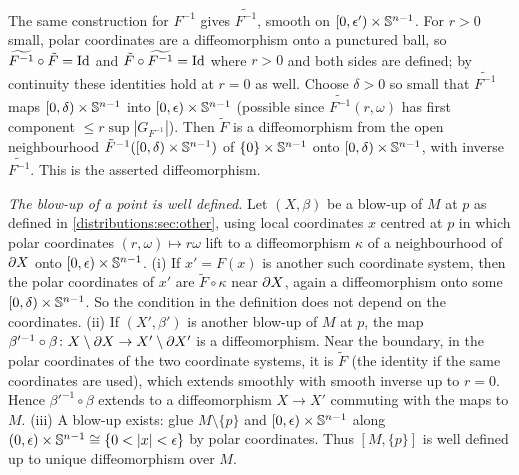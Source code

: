 The same construction for $F^{-1}$ gives $\widetilde{F^{-1}}$, smooth on
$[0,\epsilon')\times\mathbb{S}^{n-1}$. For $r>0$ small, polar coordinates are a
diffeomorphism onto a punctured ball, so $\widetilde{F^{-1}}\circ\tilde F=\operatorname{Id}$ and
$\tilde F\circ\widetilde{F^{-1}}=\operatorname{Id}$ where $r>0$ and both sides are defined; by
continuity these identities hold at $r=0$ as well. Choose $\delta>0$ so small that
$\widetilde{F^{-1}}$ maps $[0,\delta)\times\mathbb{S}^{n-1}$ into $[0,\epsilon)\times\mathbb{S}^{n-1}$
(possible since $\widetilde{F^{-1}}(r,\omega)$ has first component
$\le r\sup|G_{F^{-1}}|$). Then $\tilde F$ is a diffeomorphism from the open neighbourhood
$\tilde F^{-1}([0,\delta)\times\mathbb{S}^{n-1})$ of $\{0\}\times\mathbb{S}^{n-1}$ onto
$[0,\delta)\times\mathbb{S}^{n-1}$, with inverse $\widetilde{F^{-1}}$. This is the asserted
diffeomorphism.

\emph{The blow-up of a point is well defined.} Let $(X,\beta)$ be a blow-up of $M$ at $p$
as defined in \cref{distributions:sec:other}, using local coordinates $x$ centred at $p$
in which polar coordinates $(r,\omega)\mapsto r\omega$ lift to a diffeomorphism $\kappa$
of a neighbourhood of $\partial X$ onto $[0,\epsilon)\times\mathbb{S}^{n-1}$. (i) If $x'=F(x)$ is
another such coordinate system, then the polar coordinates of $x'$ are $\tilde F\circ\kappa$
near $\partial X$, again a diffeomorphism onto some $[0,\delta)\times\mathbb{S}^{n-1}$. So the
condition in the definition does not depend on the coordinates. (ii) If $(X',\beta')$
is another blow-up of $M$ at $p$, the map $\beta'^{-1}\circ\beta\colon X\setminus\partial X\to
X'\setminus\partial X'$ is a diffeomorphism. Near the boundary, in the polar coordinates
of the two coordinate systems, it is $\tilde F$ (the identity if the same coordinates
are used), which extends smoothly with smooth inverse up to $r=0$. Hence
$\beta'^{-1}\circ\beta$ extends to a diffeomorphism $X\to X'$ commuting with the maps to
$M$. (iii) A blow-up exists: glue $M\setminus\{p\}$ and $[0,\epsilon)\times\mathbb{S}^{n-1}$
along $(0,\epsilon)\times\Sphere^{n-1}\cong\{0<|x|<\epsilon\}$ by polar coordinates.
Thus $[M,\{p\}]$ is well defined up to unique diffeomorphism over $M$.
